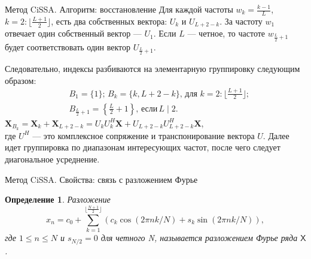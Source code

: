 \documentclass[notheorems, handout]{beamer}
\newtheorem{comment}{Замечание} %
\newtheorem{definition}{Определение}
\newcommand{\TS}{\mathsf{X}}
\begin{document}
	
	
	\begin{frame}{Метод CiSSA. Алгоритм: восстановление}
		Для каждой частоты $w_k = \frac{k-1}{L}$, $k = 2:\lfloor \frac{L+1}{2} \rfloor$, есть два собственных вектора: $U_k$ и $U_{L+2-k}$. За частоту $w_1$ отвечает один собственный вектор --- $U_1$. Если $L$ --- четное, то частоте $w_{\frac{L}{2} + 1}$ будет соответствовать один вектор $U_{\frac{L}{2}+1}$.
		
		Следовательно, индексы разбиваются на элементарную группировку следующим образом:
		\begin{equation*}
			\begin{split}
				&B_1 = \{1\}; \, B_k = \{k, L+2-k\}, \,  \text{для } k = 2:\lfloor \frac{L+1}{2}\rfloor; \\ \, 
				&B_{\frac{L}{2} + 1} = \left\{ \frac{L}{2} + 1 \right\}, \, \text{если} \, L \mid  2.
			\end{split}
		\end{equation*}
		$\mathbf X_{B_k} = \mathbf X_k + \mathbf X_{L+2-k} = U_k U_k^H \mathbf X + U_{L+2-k} U_{L+2-k}^H \mathbf X$, \\где $U^H$ --- это комплексное сопряжение и транспонирование вектора $U$. Далее идет группировка по диапазонам интересующих частот, после чего следует диагональное усреднение.
		
		
	\end{frame}
	
	
	
	\begin{frame}{Метод CiSSA. Свойства: связь с разложением Фурье}
		\begin{definition}
			Разложение
			\begin{equation}
				\label{eq:fourier}
				x_n = c_0 + \sum\limits_{k = 1}^{\lfloor \frac{N+1}{2} \rfloor}\left(c_k \cos(2\pi n k / N) + s_k \sin(2\pi n k / N) \right),
			\end{equation}
			где $1 \leq n \leq N$ и $s_{N/2} = 0 $ для четного N, называется разложением Фурье ряда $\TS$. 
		\end{definition}

		
	\end{frame}
	
\end{document}
